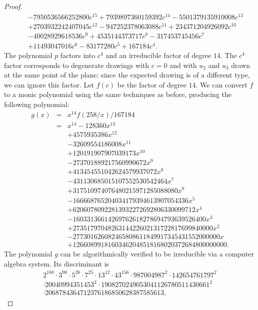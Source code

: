 \documentclass[oribibl,10pt]{llncs}
\begin{document}
\begin{appendix}
\begin{proof}
\begin{eqnarray*}
&&- 7950536566252800c^{15}
+ 7939897360159392c^{14}
- 5501379135910008c^{13}\\
&&+ 2703932242407045c^{12}
- 947252378063088c^{11}
+ 234371204926092c^{10}\\
&&- 40028929618536c^9
+ 4535144373717c^8
- 317453745456c^7\\
&&+ 11493047016c^6
- 83177280c^5
+ 167184c^4.
\end{eqnarray*}
The polynomial $p$ factors into $c^4$ and an irreducible factor of degree $14$. The $c^4$ factor corresponds to degenerate drawings with $c=0$ and with $u_2$ and $u_3$ drawn at the same point of the plane; since the expected drawing is of a different type, we can ignore this factor.
Let $f(c)$ be the factor of degree $14$. We can convert $f$ to a monic polynomial using the same techniques as before, producing the following polynomial:
\begin{eqnarray*}
g(x) &=& x^{14}f(258/x)/167184\\
&=& x^{14} - 128360x^{13}\\
&&+ 4575935386x^{12}\\
&&- 32609554186008x^{11}\\
&&+ 120191907907039173x^{10}\\
&&- 273701889217560990672x^9\\
&&+ 413454551042624579937072x^8\\
&&- 431130685015107552530542464x^7\\
&&+ 317510974076480215971285088080x^6\\
&&- 166668765204034179394613907054336x^5\\
&&+ 62060780922813932272692806330099712x^4\\
&&- 16033136614269762618278694793639526400x^3\\
&&+ 2735179704826314422602131722817699840000x^2\\
&&- 277301626082465808611849917345431552000000x\\
&&+ 12660899181603462048518168020372684800000000.
\end{eqnarray*}
The polynomial $g$ can be algorithmically verified to be irreducible via a computer algebra system. Its discriminant is
\begin{multline*}
2^{188} \cdot 3^{90} \cdot 5^{26} \cdot 7^{25} \cdot 13^{12} \cdot 43^{156} \cdot 987004987^2 \cdot 142654761797^2\\ \cdot 20040994351453^2 \cdot 1908270249053041126780511430661^2\\ \cdot 2068784364712376186850628387585613,

\end{multline*}
\end{proof}
\end{appendix}
\end{document}

